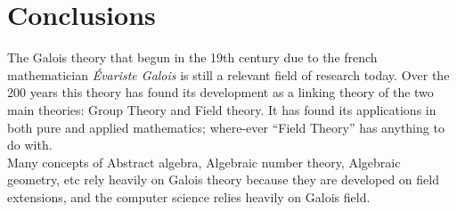 \chapter*{Conclusions}
The Galois theory that begun in the 19th century due to the french mathematician \textit{Évariste Galois} is still a relevant field of research today. Over the 200 years this theory has found its development as a linking theory of the two main theories: Group Theory and Field theory. It has found its applications in both pure and applied mathematics; where-ever ``Field Theory'' has anything to do with.\\[3mm]
Many concepts of Abstract algebra, Algebraic number theory, Algebraic geometry, etc rely heavily on Galois theory because they are developed on field extensions, and the computer science relies heavily on Galois field.